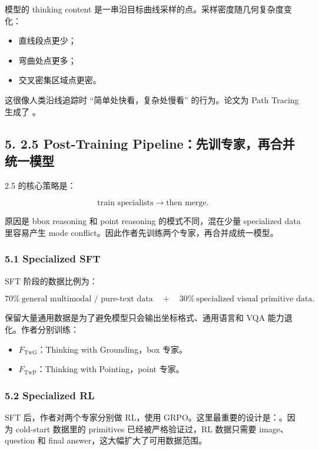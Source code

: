 模型的 thinking content 是一串沿目标曲线采样的点。采样密度随几何复杂度变化：

\begin{itemize}[leftmargin=1.5em]
  \item 直线段点更少；
  \item 弯曲处点更多；
  \item 交叉密集区域点更密。
\end{itemize}

这很像人类沿线追踪时 ``简单处快看，复杂处慢看'' 的行为。论文为 Path Tracing 生成了 。

\subsection{5. 2.5 Post-Training Pipeline：先训专家，再合并统一模型}

2.5 的核心策略是：

\[
\text{train specialists} \rightarrow \text{then merge}.
\]

原因是 bbox reasoning 和 point reasoning 的模式不同，混在少量 specialized data 里容易产生 mode conflict。因此作者先训练两个专家，再合并成统一模型。

\subsubsection{5.1 Specialized SFT}

SFT 阶段的数据比例为：

\[
70\%\ \text{general multimodal / pure-text data}
\quad + \quad
30\%\ \text{specialized visual primitive data}.
\]

保留大量通用数据是为了避免模型只会输出坐标格式、通用语言和 VQA 能力退化。作者分别训练：

\begin{itemize}[leftmargin=1.5em]
  \item $F_{\mathrm{TwG}}$：Thinking with Grounding，box 专家。
  \item $F_{\mathrm{TwP}}$：Thinking with Pointing，point 专家。
\end{itemize}

\subsubsection{5.2 Specialized RL}

SFT 后，作者对两个专家分别做 RL，使用 GRPO。这里最重要的设计是：。因为 cold-start 数据里的 primitives 已经被严格验证过，RL 数据只需要 image、question 和 final answer，这大幅扩大了可用数据范围。

